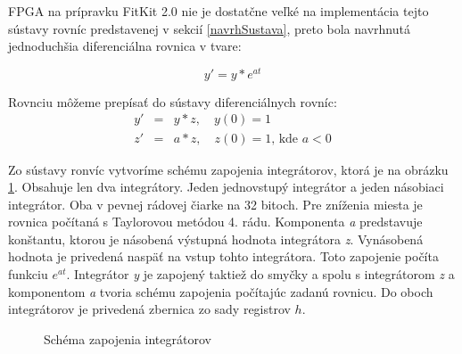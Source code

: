 

FPGA na prípravku FitKit 2.0 nie je dostatčne veľké na implementácia tejto  sústavy rovníc predstavenej v sekcií \ref{navrhSustava}, preto bola navrhnutá jednoduchšia diferenciálna rovnica v tvare:

\begin{equation}
y' = y * e^{at} \label{rovnica}
\end{equation}

Rovnciu môžeme prepísať do sústavy diferenciálnych rovníc:
\begin{eqnarray}
y' & = & y * z , \quad y(0) = 1 \label{rovnicasustava} \\
z' & = & a * z , \quad z(0) = 1 \text{, kde } a < 0
\end{eqnarray}

Zo sústavy ronvíc vytvoríme schému zapojenia integrátorov, ktorá je na obrázku \ref{ppi_fp_sustava_impl}. Obsahuje len dva integrátory. Jeden jednovstupý integrátor a jeden násobiaci integrátor. Oba v pevnej rádovej čiarke na 32 bitoch. Pre zníženia miesta je rovnica počítaná s Taylorovou metódou 4. rádu. Komponenta \textit{a} predstavuje konštantu, ktorou je násobená výstupná hodnota integrátora \textit{z}. Vynásobená hodnota je privedená naspäť na vstup tohto integrátora. Toto zapojenie počíta funkciu $ e^{at} $. Integrátor \textit{y} je zapojený taktiež do smyčky a spolu s integrátorom \textit{z} a komponentom \textit{a} tvoria schému zapojenia počítajúc zadanú rovnicu. Do oboch integrátorov je privedená zbernica zo sady registrov $ h $.

\begin{figure}[H]
\centering
{}
\caption{Schéma zapojenia integrátorov}
\label{ppi_fp_sustava_impl}
\end{figure}


